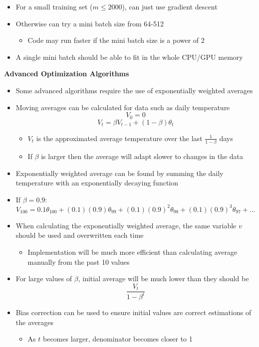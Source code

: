 \documentclass[12pt, letterpaper]{article}
\begin{document}
\begin{itemize}
\begin{itemize}
        \end{itemize}
        \item For a small training set ($m\leq 2000$), can just use gradient descent
        \item Otherwise can try a mini batch size from 64-512
        \begin{itemize}
            \item Code may run faster if the mini batch size is a power of 2
        \end{itemize}
        \item A single mini batch should be able to fit in the whole CPU/GPU memory
    \end{itemize}

    \vspace{5mm}
    \textbf{Advanced Optimization Algorithms}
    \begin{itemize}
        \item Some advanced algorithms require the use of exponentially weighted averages
        \item Moving averages can be calculated for data such as daily temperature
        $$V_0=0$$
        $$V_t=\beta V_{t-1}+(1-\beta)\theta_t$$
        \begin{itemize}
            \item $V_t$ is the approximated average temperature over the last $\frac{1}{1-\beta}$ days 
            \item If $\beta$ is larger then the average will adapt slower to changes in the data
        \end{itemize}
        \item Exponentially weighted average can be found by summing the daily temperature with an exponentially decaying function 
        \item If $\beta=0.9$:
        $$V_{100}=0.1\theta_{100}+(0.1)(0.9)\theta_{99}+(0.1)(0.9)^2\theta_{98}+(0.1)(0.9)^3\theta_{97}+...$$ 
        \item When calculating the exponentially weighted average, the same variable $v$ should be used and overwritten each time
        \begin{itemize}
            \item Implementation will be much more efficient than calculating average manually from the past 10 values 
        \end{itemize}
        \item For large values of $\beta$, initial average will be much lower than they should be 
        $$\frac{V_t}{1-\beta^t}$$
        \item Bias correction can be used to ensure initial values are correct estimations of the averages
        \begin{itemize}
            \item As $t$ becomes larger, denominator becomes closer to 1
        \end{itemize}
    \end{itemize}
\end{document}
